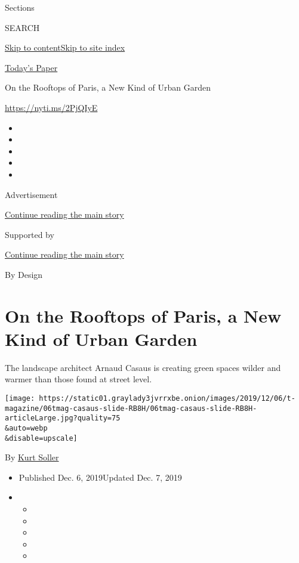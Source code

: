 Sections

SEARCH

\protect\hyperlink{site-content}{Skip to
content}\protect\hyperlink{site-index}{Skip to site index}

\href{https://myaccount.nytimes3xbfgragh.onion/auth/login?response_type=cookie\&client_id=vi}{}

\href{https://www.nytimes3xbfgragh.onion/section/todayspaper}{Today's
Paper}

On the Rooftops of Paris, a New Kind of Urban Garden

\url{https://nyti.ms/2PjQIyE}

\begin{itemize}
\item
\item
\item
\item
\item
\end{itemize}

Advertisement

\protect\hyperlink{after-top}{Continue reading the main story}

Supported by

\protect\hyperlink{after-sponsor}{Continue reading the main story}

By Design

\hypertarget{on-the-rooftops-of-paris-a-new-kind-of-urban-garden}{%
\section{On the Rooftops of Paris, a New Kind of Urban
Garden}\label{on-the-rooftops-of-paris-a-new-kind-of-urban-garden}}

The landscape architect Arnaud Casaus is creating green spaces wilder
and warmer than those found at street level.

\texttt{[image: https://static01.graylady3jvrrxbe.onion/images/2019/12/06/t-magazine/06tmag-casaus-slide-RB8H/06tmag-casaus-slide-RB8H-articleLarge.jpg?quality=75\\\&auto=webp\\\&disable=upscale]}

By \href{https://www.nytimes3xbfgragh.onion/by/kurt-soller}{Kurt Soller}

\begin{itemize}
\item
  Published Dec. 6, 2019Updated Dec. 7, 2019
\item
  \begin{itemize}
  \item
  \item
  \item
  \item
  \item
  \end{itemize}
\end{itemize}

